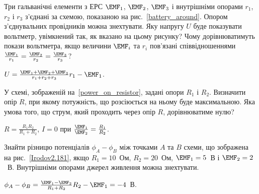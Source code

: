\begin{problem}\label{prb:battery_around}%
Три гальванічні елементи з ЕРС $\EMF_1$, $\EMF_2$, $\EMF_3$ і внутрішніми опорами $r_1$, $r_2$ і  $r_3$ з'єднані за схемою, показаною на рис.~\ref{battery_around}. Опором з'єднувальних провідників можна знехтувати. Яку напругу $U$ буде показувати вольтметр, увімкнений так, як вказано на цьому рисунку? Чому дорівнюватимуть покази вольтметра, якщо величини $\EMF_i$ та $r_i$ пов'язані співвідношеннями $\frac{\EMF_1}{r_1} = \frac{\EMF_2}{r_2} = \frac{\EMF_3}{r_3}$?
\begin{solution}
	$U = \frac{\EMF_1+\EMF_2+\EMF_3}{r_1 + r_2 + r_3} r_1 - \EMF_1$.
\end{solution}
\end{problem}

\begin{problem}\label{prb:power_on_resistor}%
У схемі, зображеній на~\ref{power_on_resistor}, задані опори $R_1$ і $R_2$. Визначити опір $R$, при якому потужність, що розсіюється на ньому буде максимальною. Яка умова того, що струм, який проходить через опір $R$, дорівнюватиме нулю?
\begin{solution}
	$R = \frac{R_1R_2}{R_1 + R_2}$, $I = 0$ при $\frac{\EMF_1}{\EMF_2} = \frac{R_1}{R_2}$.
\end{solution}
\end{problem}

\begin{problem}\label{prb:Irodov2.181}
Знайти різницю потенціалів $\phi_A - \phi_B$ між точками $A$ та $B$ схеми, що зображена на рис.~\ref{Irodov2.181}, якщо $R_1 = 10$~Ом, $R_2 = 20$~Ом, $\EMF_1 = 5$~В і  $\EMF_2= 2$~В. Внутрішніми опорами джерел живлення можна знехтувати.
\begin{solution}
	$\phi_A - \phi_B = \frac{\EMF_1 - \EMF_2}{R_1 + R_2} R_2 - \EMF_1 =-4$~В.
\end{solution}
\end{problem}

